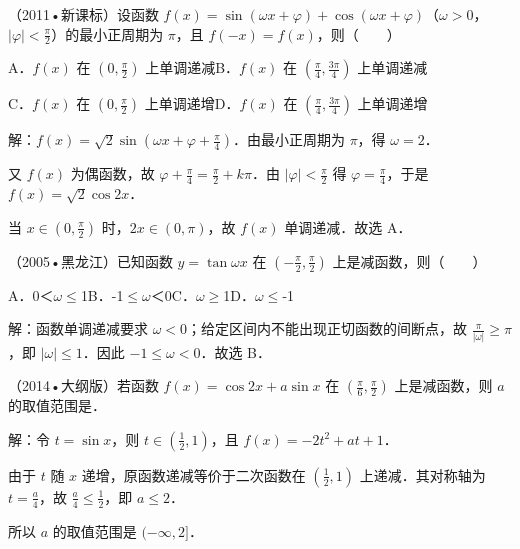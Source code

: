 \begin{question}
（2011•新课标）设函数 $f(x)=\sin(\omega x+\varphi)+\cos(\omega x+\varphi)$（$\omega>0$，$|\varphi|<\frac{\pi}{2}$）的最小正周期为 $\pi$，且 $f(-x)=f(x)$，则（　　）\par
A．$f(x)$ 在 $(0,\frac{\pi}{2})$ 上单调递减\qquad B．$f(x)$ 在 $(\frac{\pi}{4},\frac{3\pi}{4})$ 上单调递减\par
C．$f(x)$ 在 $(0,\frac{\pi}{2})$ 上单调递增\qquad D．$f(x)$ 在 $(\frac{\pi}{4},\frac{3\pi}{4})$ 上单调递增\par
\begin{solution}
解：$f(x)=\sqrt2\sin(\omega x+\varphi+\frac{\pi}{4})$．由最小正周期为 $\pi$，得 $\omega=2$．\par
又 $f(x)$ 为偶函数，故 $\varphi+\frac{\pi}{4}=\frac{\pi}{2}+k\pi$．由 $|\varphi|<\frac{\pi}{2}$ 得 $\varphi=\frac{\pi}{4}$，于是 $f(x)=\sqrt2\cos2x$．\par
当 $x\in(0,\frac{\pi}{2})$ 时，$2x\in(0,\pi)$，故 $f(x)$ 单调递减．故选 A．\par
\end{solution}
\end{question}

\begin{question}
（2005•黑龙江）已知函数 $y=\tan\omega x$ 在 $(-\frac{\pi}{2},\frac{\pi}{2})$ 上是减函数，则（　　）\par
A．0＜\ensuremath{\omega}\ensuremath{\le}1\qquad{}B．-1\ensuremath{\le}\ensuremath{\omega}＜0\qquad{}C．\ensuremath{\omega}\ensuremath{\ge}1\qquad{}D．\ensuremath{\omega}\ensuremath{\le}-1\par
\begin{solution}
解：函数单调递减要求 $\omega<0$；给定区间内不能出现正切函数的间断点，故 $\frac{\pi}{|\omega|}\geq\pi$，即 $|\omega|\leq1$．因此 $-1\leq\omega<0$．故选 B．\par
\end{solution}
\end{question}

\begin{question}
（2014•大纲版）若函数 $f(x)=\cos2x+a\sin x$ 在 $(\frac{\pi}{6},\frac{\pi}{2})$ 上是减函数，则 $a$ 的取值范围是\AnswerBlank{\ensuremath{(-\infty,2]}}．\par
\begin{solution}
解：令 $t=\sin x$，则 $t\in(\frac12,1)$，且 $f(x)=-2t^2+at+1$．\par
由于 $t$ 随 $x$ 递增，原函数递减等价于二次函数在 $(\frac12,1)$ 上递减．其对称轴为 $t=\frac a4$，故 $\frac a4\leq\frac12$，即 $a\leq2$．\par
所以 $a$ 的取值范围是 $(-\infty,2]$．\par
\end{solution}
\end{question}

